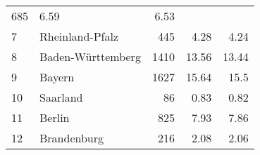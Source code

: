 \begin{longtable}{lXrrr}
       \num{685} &
       \num[round-mode=places,round-precision=2]{6.59} &
         \num[round-mode=places,round-precision=2]{6.53} \\

     7 &
     \multicolumn{1}{X}{ Rheinland-Pfalz   } &


       \num{445} &
       \num[round-mode=places,round-precision=2]{4.28} &
         \num[round-mode=places,round-precision=2]{4.24} \\

     8 &
     \multicolumn{1}{X}{ Baden-Württemberg   } &


       \num{1410} &
       \num[round-mode=places,round-precision=2]{13.56} &
         \num[round-mode=places,round-precision=2]{13.44} \\

     9 &
     \multicolumn{1}{X}{ Bayern   } &


       \num{1627} &
       \num[round-mode=places,round-precision=2]{15.64} &
         \num[round-mode=places,round-precision=2]{15.5} \\

     10 &
     \multicolumn{1}{X}{ Saarland   } &


       \num{86} &
       \num[round-mode=places,round-precision=2]{0.83} &
         \num[round-mode=places,round-precision=2]{0.82} \\

     11 &
     \multicolumn{1}{X}{ Berlin   } &


       \num{825} &
       \num[round-mode=places,round-precision=2]{7.93} &
         \num[round-mode=places,round-precision=2]{7.86} \\

     12 &
     \multicolumn{1}{X}{ Brandenburg   } &


       \num{216} &
       \num[round-mode=places,round-precision=2]{2.08} &
         \num[round-mode=places,round-precision=2]{2.06} \\


\end{longtable}
